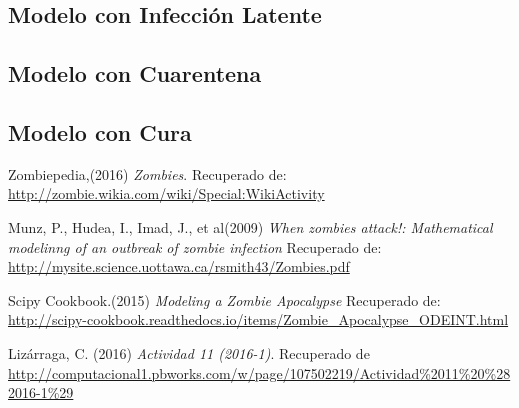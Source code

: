 \documentclass[12pt]{article}
\begin{document}
\subsection{Modelo con Infección Latente}


\subsection{Modelo con Cuarentena}


\subsection{Modelo con Cura}




%
\pagebreak
\begin{thebibliography}{6}
	Zombiepedia,(2016)
	\emph{Zombies}. Recuperado de: \url{http://zombie.wikia.com/wiki/Special:WikiActivity}

	Munz, P., Hudea, I., Imad, J., et al(2009)
	\emph{When zombies attack!: Mathematical modelinng of an outbreak of zombie infection} Recuperado de: \url{http://mysite.science.uottawa.ca/rsmith43/Zombies.pdf}

	Scipy Cookbook.(2015)
	\emph{Modeling a Zombie Apocalypse} Recuperado de: \url{http://scipy-cookbook.readthedocs.io/items/Zombie\_Apocalypse\_ODEINT.html}


	Lizárraga, C. (2016)
	\emph{Actividad 11 (2016-1)}. Recuperado de \url{http://computacional1.pbworks.com/w/page/107502219/Actividad\%2011\%20\%282016-1\%29}
\end{thebibliography}
\end{document}
